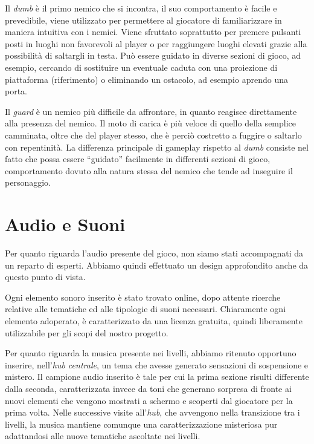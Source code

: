 Il \textit{dumb} è il primo nemico che si incontra, il suo comportamento è facile e prevedibile, viene utilizzato per permettere al giocatore di familiarizzare in maniera intuitiva con i nemici. Viene sfruttato soprattutto per premere pulsanti posti in luoghi non favorevoli al player o per raggiungere luoghi elevati grazie alla possibilità di saltargli in testa. Può essere guidato in diverse sezioni di gioco, ad esempio, cercando di sostituire un eventuale caduta con una proiezione di piattaforma (riferimento) o eliminando un ostacolo, ad esempio aprendo una porta.

Il \textit{guard} è un nemico più difficile da affrontare, in quanto reagisce direttamente alla presenza del nemico. Il moto di carica è più veloce di quello della semplice camminata, oltre che del player stesso, che è perciò costretto a fuggire o saltarlo con repentinità. La differenza principale di gameplay rispetto al \textit{dumb} consiste nel fatto che possa essere “guidato” facilmente in differenti sezioni di gioco, comportamento dovuto alla natura stessa del nemico che tende ad inseguire il personaggio.

\section{Audio e Suoni}
\label{sec:audio}

Per quanto riguarda l’audio presente del gioco, non siamo stati accompagnati da un reparto di esperti. Abbiamo quindi effettuato un design approfondito anche da questo punto di vista. 

Ogni elemento sonoro inserito è stato trovato online, dopo attente ricerche relative alle tematiche ed alle tipologie di suoni necessari. Chiaramente ogni elemento adoperato, è caratterizzato da una licenza gratuita, quindi liberamente utilizzabile per gli scopi del nostro progetto.

Per quanto riguarda la musica presente nei livelli, abbiamo ritenuto opportuno inserire, nell’\textit{hub centrale}, un tema che avesse generato sensazioni di sospensione e mistero. Il campione audio inserito è tale per cui la prima sezione risulti differente dalla seconda, caratterizzata invece da toni che generano sorpresa di fronte ai nuovi elementi che vengono mostrati a schermo e scoperti dal giocatore per la prima volta.
Nelle successive visite all’\textit{hub}, che avvengono nella transizione tra i livelli, la musica mantiene comunque una caratterizzazione misteriosa pur adattandosi alle nuove tematiche ascoltate nei livelli.

